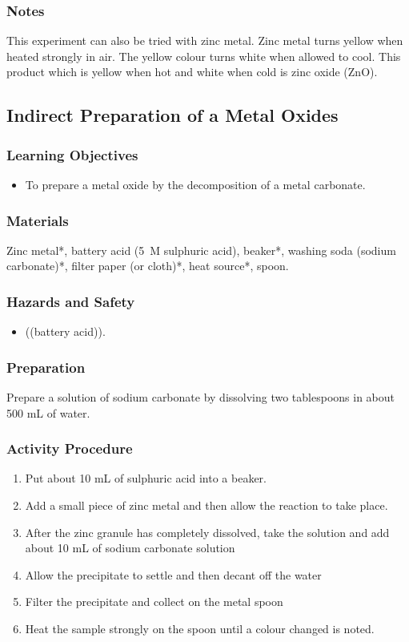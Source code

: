 \subsubsection*{Notes}
This experiment can also be tried with zinc metal. Zinc metal turns yellow when heated strongly in air. The yellow colour turns white when allowed to cool. This product which is yellow when hot and white when cold is zinc oxide (ZnO).

\subsection{Indirect Preparation of a Metal Oxides}

\subsubsection*{Learning Objectives}
\begin{itemize}
\item{To prepare a metal oxide by the decomposition of a metal carbonate.}
\end{itemize}

\subsubsection*{Materials}
Zinc metal*, battery acid (5~M sulphuric acid), beaker*, washing soda (sodium carbonate)*, filter paper (or cloth)*, heat source*, spoon.

\subsubsection*{Hazards and Safety}
\begin{itemize}
\item{((battery acid)).}
\end{itemize}
\subsubsection*{Preparation}
Prepare a solution of sodium carbonate by dissolving two tablespoons in about 500 mL of water.

\subsubsection*{Activity Procedure}
\begin{enumerate}
\item{Put about 10 mL of sulphuric acid into a beaker.}
\item{Add a small piece of zinc metal and then allow the reaction to take place.}
\item{After the zinc granule has completely dissolved, take the solution and add about 10 mL of sodium carbonate solution}
\item{Allow the precipitate to settle and then decant off the water}
\item{Filter the precipitate and collect on the metal spoon}
\item{Heat the sample strongly on the spoon  until a colour changed is noted.}
\end{enumerate}

